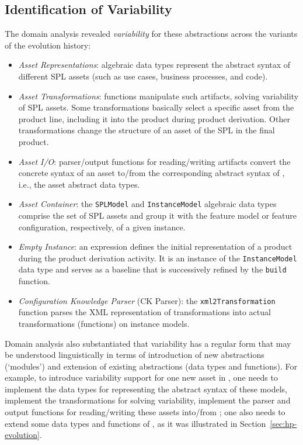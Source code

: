 
\subsection{Identification of Variability} 
\label{sec:variability}

The domain analysis revealed \emph{variability} for these abstractions across the variants of the evolution history:

\begin{itemize}

\item \emph{Asset Representations}: algebraic data types represent the abstract syntax of different SPL assets (such as use cases, business processes, and code).

\item \emph{Asset Transformations}: functions manipulate such artifacts, solving variability of SPL assets. Some transformations basically select a specific asset from the product line, including it into the product during product derivation. Other transformations change the structure of an asset of the SPL in the final product.

\item \emph{Asset I/O}: parser/output functions for reading/writing artifacts convert the concrete syntax of an asset to/from the corresponding abstract syntax of \hpl{}, i.e., the asset abstract data types.

\item \emph{Asset Container}: the \texttt{SPLModel} and \texttt{InstanceModel} algebraic data types comprise the set of SPL assets and group it with the feature model or feature configuration, respectively, of a given \hpl{} instance.

\item \emph{Empty Instance}: an expression defines the initial representation of a product during the product derivation activity. It is an instance of the \texttt{InstanceModel} data type and serves as a baseline that is successively refined by the \texttt{build} function.

\item \emph{Configuration Knowledge Parser} (CK Parser): the \texttt{xml2Transformation} function parses the XML representation of transformations into actual transformations (functions) on instance models.

\end{itemize}

Domain analysis also substantiated that variability has a regular form that may be understood linguistically in terms of introduction of new abstractions (`modules') and extension of existing abstractions (data types and functions). For example, to introduce variability support for one new asset in \hp, one needs to implement the data types for representing the abstract syntax of these models, implement the transformations for solving variability, implement the parser and output functions for reading/writing these assets into/from \hp; one also needs to extend some data types and functions of \hp{}, as it was illustrated in Section~\ref{sec:hp-evolution}.
